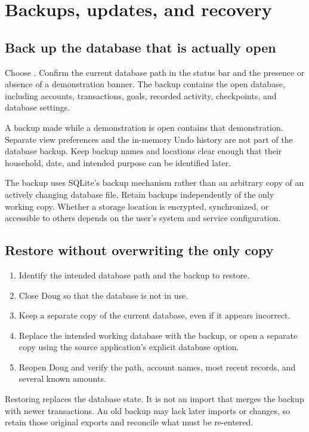 \chapter{Backups, updates, and recovery}\label{ch:data}
\section{Back up the database that is actually open}
Choose . Confirm the current database path in the status bar and the presence or absence of a demonstration banner. The backup contains the open database, including accounts, transactions, goals, recorded activity, checkpoints, and database settings.

A backup made while a demonstration is open contains that demonstration. Separate view preferences and the in-memory Undo history are not part of the database backup. Keep backup names and locations clear enough that their household, date, and intended purpose can be identified later.

The backup uses SQLite's backup mechanism rather than an arbitrary copy of an actively changing database file. Retain backups independently of the only working copy. Whether a storage location is encrypted, synchronized, or accessible to others depends on the user's system and service configuration.

\section{Restore without overwriting the only copy}
\begin{enumerate}
\item Identify the intended database path and the backup to restore.
\item Close Doug so that the database is not in use.
\item Keep a separate copy of the current database, even if it appears incorrect.
\item Replace the intended working database with the backup, or open a separate copy using the source application's explicit database option.
\item Reopen Doug and verify the path, account names, most recent records, and several known amounts.
\end{enumerate}

Restoring replaces the database state. It is not an import that merges the backup with newer transactions. An old backup may lack later imports or changes, so retain those original exports and reconcile what must be re-entered.

